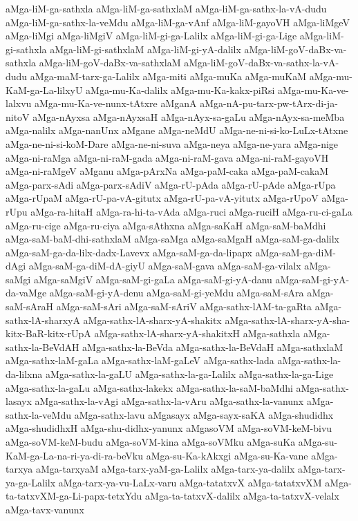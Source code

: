{aMga-liM-ga-sathxla
aMga-liM-ga-sathxlaM
aMga-liM-ga-sathx-la-vA-dudu
aMga-liM-ga-sathx-la-veMdu
aMga-liM-ga-vAnf
aMga-liM-gayoVH
aMga-liMgeV
aMga-liMgi
aMga-liMgiV
aMga-liM-gi-ga-Lalilx
aMga-liM-gi-ga-Lige
aMga-liM-gi-sathxla
aMga-liM-gi-sathxlaM
aMga-liM-gi-yA-dalilx
aMga-liM-goV-daBx-va-sathxla
aMga-liM-goV-daBx-va-sathxlaM
aMga-liM-goV-daBx-va-sathx-la-vA-dudu
aMga-maM-tarx-ga-Lalilx
aMga-miti
aMga-muKa
aMga-muKaM
aMga-mu-KaM-ga-La-lilxyU
aMga-mu-Ka-dalilx
aMga-mu-Ka-kakx-piRsi
aMga-mu-Ka-ve-lalxvu
aMga-mu-Ka-ve-nunx-tAtxre
aMganA
aMga-nA-pu-tarx-pw-tArx-di-ja-nitoV
aMga-nAyxsa
aMga-nAyxsaH
aMga-nAyx-sa-gaLu
aMga-nAyx-sa-meMba
aMga-nalilx
aMga-nanUnx
aMgane
aMga-neMdU
aMga-ne-ni-si-ko-LuLx-tAtxne
aMga-ne-ni-si-koM-Dare
aMga-ne-ni-suva
aMga-neya
aMga-ne-yara
aMga-nige
aMga-ni-raMga
aMga-ni-raM-gada
aMga-ni-raM-gava
aMga-ni-raM-gayoVH
aMga-ni-raMgeV
aMganu
aMga-pArxNa
aMga-paM-caka
aMga-paM-cakaM
aMga-parx-sAdi
aMga-parx-sAdiV
aMga-rU-pAda
aMga-rU-pAde
aMga-rUpa
aMga-rUpaM
aMga-rU-pa-vA-gitutx
aMga-rU-pa-vA-yitutx
aMga-rUpoV
aMga-rUpu
aMga-ra-hitaH
aMga-ra-hi-ta-vAda
aMga-ruci
aMga-ruciH
aMga-ru-ci-gaLa
aMga-ru-cige
aMga-ru-ciya
aMga-sAthxna
aMga-saKaH
aMga-saM-baMdhi
aMga-saM-baM-dhi-sathxlaM
aMga-saMga
aMga-saMgaH
aMga-saM-ga-dalilx
aMga-saM-ga-da-lilx-dadx-Lavevx
aMga-saM-ga-da-lipapx
aMga-saM-ga-diM-dAgi
aMga-saM-ga-diM-dA-giyU
aMga-saM-gava
aMga-saM-ga-vilalx
aMga-saMgi
aMga-saMgiV
aMga-saM-gi-gaLa
aMga-saM-gi-yA-danu
aMga-saM-gi-yA-da-vaMge
aMga-saM-gi-yA-denu
aMga-saM-gi-yeMdu
aMga-saM-sAra
aMga-saM-sAraH
aMga-saM-sAri
aMga-saM-sAriV
aMga-sathx-lAM-ta-gaRta
aMga-sathx-lA-sharxyA
aMga-sathx-lA-sharx-yA-shakitx
aMga-sathx-lA-sharx-yA-sha-kitx-BaR-kitx-rUpA
aMga-sathx-lA-sharx-yA-shakitxH
aMga-sathxla
aMga-sathx-la-BeVdAH
aMga-sathx-la-BeVda
aMga-sathx-la-BeVdaH
aMga-sathxlaM
aMga-sathx-laM-gaLa
aMga-sathx-laM-gaLeV
aMga-sathx-lada
aMga-sathx-la-da-lilxna
aMga-sathx-la-gaLU
aMga-sathx-la-ga-Lalilx
aMga-sathx-la-ga-Lige
aMga-sathx-la-gaLu
aMga-sathx-lakekx
aMga-sathx-la-saM-baMdhi
aMga-sathx-lasayx
aMga-sathx-la-vAgi
aMga-sathx-la-vAru
aMga-sathx-la-vanunx
aMga-sathx-la-veMdu
aMga-sathx-lavu
aMgasayx
aMga-sayx-saKA
aMga-shudidhx
aMga-shudidhxH
aMga-shu-didhx-yanunx
aMgasoVM
aMga-soVM-keM-bivu
aMga-soVM-keM-budu
aMga-soVM-kina
aMga-soVMku
aMga-suKa
aMga-su-KaM-ga-La-na-ri-ya-di-ra-beVku
aMga-su-Ka-kAkxgi
aMga-su-Ka-vane
aMga-tarxya
aMga-tarxyaM
aMga-tarx-yaM-ga-Lalilx
aMga-tarx-ya-dalilx
aMga-tarx-ya-ga-Lalilx
aMga-tarx-ya-vu-LaLx-varu
aMga-tatatxvX
aMga-tatatxvXM
aMga-ta-tatxvXM-ga-Li-papx-tetxYdu
aMga-ta-tatxvX-dalilx
aMga-ta-tatxvX-velalx
aMga-tavx-vanunx
}
